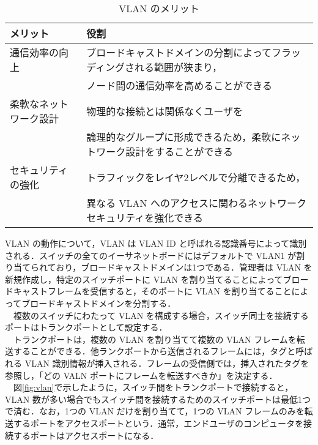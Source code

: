\documentclass[a4j,titlepage]{jarticle}
\begin{document}
\begin{table}[htbp]
\caption{VLAN のメリット\cite{bib:cisco}}
\label{tab:vlan}
\begin{center}
\begin{tabular}{|l|l|}
  \hline
メリット & 役割 \\ \hline \hline
通信効率の向上 & ブロードキャストドメインの分割によってフラッディングされる範囲が狭まり，\\ & ノード間の通信効率を高めることができる\\  \hline
柔軟なネットワーク設計 & 物理的な接続とは関係なくユーザを\\
 & 論理的なグループに形成できるため，柔軟にネットワーク設計をすることができる\\ \hline
セキュリティの強化 & トラフィックをレイヤ2レベルで分離できるため，\\
 & 異なる VLAN へのアクセスに関わるネットワークセキュリティを強化できる\\ \hline
\end{tabular}
\end{center}
\end{table}

VLAN の動作について，VLAN は VLAN ID と呼ばれる認識番号によって識別される．スイッチの全てのイーサネットボードにはデフォルトで VLAN1 が割り当てられており，ブロードキャストドメインは1つである．管理者は VLAN を新規作成し，特定のスイッチポートに VLAN を割り当てることによってブロードキャストフレームを受信すると，そのポートに VLAN を割り当てることによってブロードキャストドメインを分割する．\\
　複数のスイッチにわたって VLAN を構成する場合，スイッチ同士を接続するポートはトランクポートとして設定する．\\
　トランクポートは，複数の VLAN を割り当てて複数の VLAN フレームを転送することができる．他ランクポートから送信されるフレームには，タグと呼ばれる VLAN 識別情報が挿入される．フレームの受信側では，挿入されたタグを参照し，「どの VALN ポートにフレームを転送すべきか」を決定する．\\
　図\ref{fig:vlan}で示したように，スイッチ間をトランクポートで接続すると，VLAN 数が多い場合でもスイッチ間を接続するためのスイッチポートは最低1つで済む．なお，1つの VLAN だけを割り当てて，1つの VLAN フレームのみを転送するポートをアクセスポートという．通常，エンドユーザのコンピュータを接続するポートはアクセスポートになる．

\newpage
\end{document}
